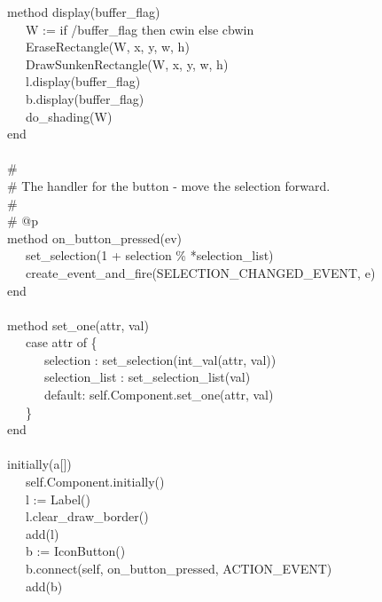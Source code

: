 {\>   method display(buffer\_flag) \\
\>   \ \ \ W := if /buffer\_flag then cwin else cbwin \\
\>   \ \ \ EraseRectangle(W, x, y, w, h) \\
\>   \ \ \ DrawSunkenRectangle(W, x, y, w, h) \\
\>   \ \ \ l.display(buffer\_flag) \\
\>   \ \ \ b.display(buffer\_flag) \\
\>   \ \ \ do\_shading(W) \\
\>   end \\
\ \\
\>   \# \\
\>   \# The handler for the button - move the selection forward. \\
\>   \# \\
\>   \# @p \\
\>   method on\_button\_pressed(ev) \\
\>   \ \ \ set\_selection(1 + selection \%
*selection\_list) \\
\>   \ \ \ create\_event\_and\_fire(SELECTION\_CHANGED\_EVENT, e) \\
\>   end \\
\ \\
\>   method set\_one(attr, val) \\
\>   \ \ \ case attr of \{ \\
\>   \ \ \ \ \ \ {\textquotedbl}selection{\textquotedbl} :
set\_selection(int\_val(attr, val)) \\
\>   \ \ \ \ \ \ {\textquotedbl}selection\_list{\textquotedbl} :
set\_selection\_list(val) \\
\>   \ \ \ \ \ \ default: self.Component.set\_one(attr, val) \\
\>   \ \ \ \} \\
\>   end \\
\ \\
\>   initially(a[])  \\
\>   \ \ \ self.Component.initially() \\
\>   \ \ \ l := Label() \\
\>   \ \ \ l.clear\_draw\_border() \\
\>   \ \ \ add(l) \\
\>   \ \ \ b := IconButton() \\
\>   \ \ \ b.connect(self,
{\textquotedbl}on\_button\_pressed{\textquotedbl}, ACTION\_EVENT) \\
\>   \ \ \ add(b) \\
}
